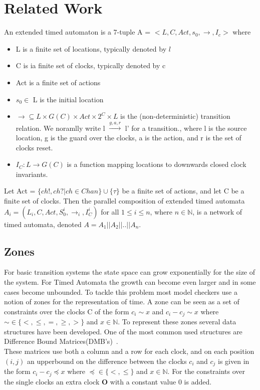 \documentclass[11pt]{article}
\begin{document}
\section{Related Work}

\begin{mydef}
\label{def:TA}
An extended timed automaton is a 7-tuple A = $<L, C, Act, s_0, \rightarrow, I_c>$ where
{\renewcommand\labelitemi{--}
	\begin{itemize}
		\item L is a finite set of locations, typically denoted by $l$
		\item C is ia finite set of clocks, typically denoted by c
		\item Act is a finite set of actions
		\item $s_0 \in$ L is the initial location
		\item $\rightarrow \subseteq L \times G(C) \times Act \times 2^C \times L$ is the (non-deterministic) transition relation. We noramlly write l $\stackrel{g,a,r}{\longrightarrow}$ l' for a transition., where l is the source location, g is the guard over the clocks, a is the action, and r is the set of clocks reset.
		\item $I_C : L \rightarrow G(C)$ is a function mapping locations to downwards closed clock invariants.
	\end{itemize}
}
\end{mydef}

\begin{mydef}
\label{def:networkTA}
Let Act = $\{ch!,ch?|ch \in Chan\} \cup \{\tau\}$ be a finite set of actions, and let C be a finite set of clocks. Then the parallel composition of extended timed automata $A_i = (L_i, C, Act, S^i_0, \rightarrow_{i}, I^i_C)$ for all $1 \leq i \leq n$, where $n \in \mathbb{N}$, is a network of timed automata, denoted $A = A_1||A_2||..||A_n$.
\end{mydef}

\subsection{Zones}
For basic transition systems the state space can grow exponentially for the size of the system. For Timed Automata the growth can become even larger and in some cases become unbounded. To tackle this problem most model checkers use a notion of zones for the representation of time. A zone can be seen as a set of constraints over the clocks C of the form $c_i \sim x$ and $c_i - c_j \sim x$ where $\sim  \in \{<, \leq, =, \geq, >\}$ and $x \in \mathbb{N}$. To represent these zones several data structures have been developed. One of the most common used structures are Difference Bound Matrices(DMB's)~\cite{bengtsson2002clocks}.\\ 
These matrices use both a column and a row for each clock, and on each position $(i,j)$ an upperbound on the difference between the clocks $c_i$ and $c_j$ is given in the form $c_i - c_j \preceq x$ where $\preceq \in \{<, \leq\}$ and $x \in \mathbb{N}$. For the constraints over the single clocks an extra clock $\mathbf{O}$ with a constant value 0 is added.

{}

\end{document}
